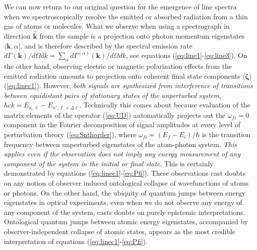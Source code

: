 \documentclass[final,3p,times,twocolumn]{elsarticle3}
\begin{document}
We can now return to our original question for the emergence of line
spectra when we spectroscopically resolve the emitted or absorbed
radiation from a thin gas of atoms or molecules. What we observe when 
using a spectrograph in direction $\hat{\bm{k}}$ from the sample is a 
projection onto photon momentum eigenstates $\bm{\langle}\bm{k},\alpha\bm{|}$, 
and is therefore described by the spectral emission 
rate $d\Gamma(\bm{k})/d\Omega dk=\sum_\alpha d\Gamma^{(\alpha)}(\bm{k})/d\Omega dk$, 
see equations (\ref{eq:line1}-\ref{eq:line3}). On the other hand, observing 
electric or magnetic polarization effects from the emitted radiation amounts 
to projection onto coherent final state components $\bm{\langle}\bm{\zeta}\bm{|}$
(\ref{eq:linec1}). However, {\it both signals are synthesized from 
interference of transitions between equidistant pairs of stationary 
states of the unperturbed system}, $\hbar ck=E_{n,\ell}-E_{n',\ell+\Delta\ell}$.
Technically this comes about because evaluation of the matrix elements of 
the operator (\ref{eq:UD}) automatically projects out the $\omega_{fi}=0$
component in the Fourier decomposition of signal amplitudes at every level 
of perturbation theory (\ref{eq:Snthorder}), where $\omega_{fi}=(E_f-E_i)/\hbar$ 
is the transition frequency between unperturbed eigenstates of the atom-photon 
system. {\it This applies even if the observation does not imply any energy 
measurement of any component of the system in the initial or final state}. 
This is certainly demonstrated by equations (\ref{eq:linec1}-\ref{eq:Pfi}).
These observations cast doubts on any notion of observer induced ontological
collapse of wavefunctions of atoms or photons.
On the other hand, the ubiquity of quantum jumps between energy eigenstates 
in optical experiments, even when we do not observe any energy of any 
component of the system, casts doubts on purely epistemic interpretations.
Ontological quantum jumps between atomic energy eigenstates, accompanied
by observer-independent collapse of atomic states, appears as the most
credible interpretation of equations (\ref{eq:linec1}-\ref{eq:Pfi}).
\end{document}
